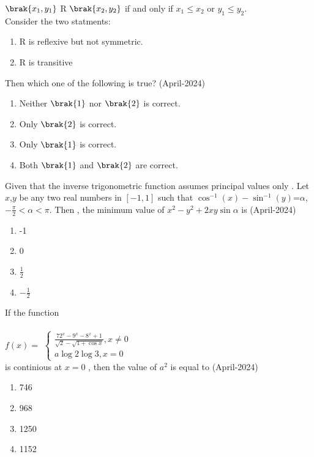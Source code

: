 $\brak{x_1,y_1}$ R $\brak{x_2,y_2}$ if and only if $x_1\leq x_2$ or $y_1\leq y_2$.\\
Consider the two statments:
\begin{enumerate}
\item R is reflexive but not symmetric.
\item R is transitive
\end{enumerate}
Then which one of the following is true?
\hfill{(April-2024)}
\begin{multicols}{2}
\begin{enumerate}
\item Neither $\brak{1}$ nor $\brak{2}$ is correct. 
\item Only $\brak{2}$ is correct.
\item Only $\brak{1}$ is correct. 
\item Both $\brak{1}$ and $\brak{2}$ are correct.
\end{enumerate}
\end{multicols}
\item Given that the inverse trigonometric function assumes principal values only . Let $x$,$y$ be any two real numbers in $[-1,1]$ such that  $\cos^{-1}(x)-\sin^{-1}(y)$=$\alpha $,$-\frac{\pi}{2}<\alpha<\pi$.
Then , the minimum value of $x^2-y^2+2xy\sin{\alpha}$ is 
\hfill{(April-2024)}
\begin{multicols}{2}
\begin{enumerate}
\item -1
\item 0
\item $\frac{1}{2}$
\item $-\frac{1}{2}$
\end{enumerate}
\end{multicols}
\item If the function\\
\\$f(x)=$
$ \begin{cases}
   \frac{72^x-9^x-8^x+1}{\sqrt{2}-\sqrt{1+\cos{x}}},x \neq 0\\
   a\log2\log3,x=0
\end{cases} $ \\
is continious at $x=0$ , then the value of $a^2$ is equal to 
\hfill{(April-2024)}
\begin{multicols}{2}
\begin{enumerate}
\item 746
\item 968 
\item 1250
\item 1152
\end{enumerate}
\end{multicols}
